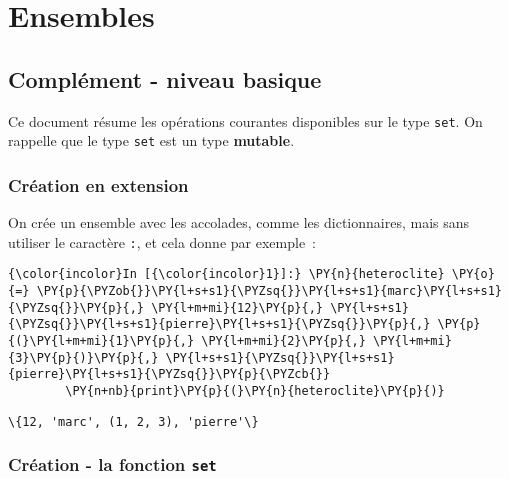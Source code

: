     
    
    
    

    

    \hypertarget{ensembles}{%
\section{Ensembles}\label{ensembles}}

    \hypertarget{compluxe9ment---niveau-basique}{%
\subsection{Complément - niveau
basique}\label{compluxe9ment---niveau-basique}}

    Ce document résume les opérations courantes disponibles sur le type
\texttt{set}. On rappelle que le type \texttt{set} est un type
\textbf{mutable}.

    \hypertarget{cruxe9ation-en-extension}{%
\subsubsection{Création en extension}\label{cruxe9ation-en-extension}}

    On crée un ensemble avec les accolades, comme les dictionnaires, mais
sans utiliser le caractère \texttt{:}, et cela donne par exemple~:

    \begin{Verbatim}[commandchars=\\\{\},frame=single,framerule=0.3mm,rulecolor=\color{cellframecolor}]
{\color{incolor}In [{\color{incolor}1}]:} \PY{n}{heteroclite} \PY{o}{=} \PY{p}{\PYZob{}}\PY{l+s+s1}{\PYZsq{}}\PY{l+s+s1}{marc}\PY{l+s+s1}{\PYZsq{}}\PY{p}{,} \PY{l+m+mi}{12}\PY{p}{,} \PY{l+s+s1}{\PYZsq{}}\PY{l+s+s1}{pierre}\PY{l+s+s1}{\PYZsq{}}\PY{p}{,} \PY{p}{(}\PY{l+m+mi}{1}\PY{p}{,} \PY{l+m+mi}{2}\PY{p}{,} \PY{l+m+mi}{3}\PY{p}{)}\PY{p}{,} \PY{l+s+s1}{\PYZsq{}}\PY{l+s+s1}{pierre}\PY{l+s+s1}{\PYZsq{}}\PY{p}{\PYZcb{}}
        \PY{n+nb}{print}\PY{p}{(}\PY{n}{heteroclite}\PY{p}{)}
\end{Verbatim}


    \begin{Verbatim}[commandchars=\\\{\},frame=single,framerule=0.3mm,rulecolor=\color{cellframecolor}]
\{12, 'marc', (1, 2, 3), 'pierre'\}
\end{Verbatim}

    \hypertarget{cruxe9ation---la-fonction-set}{%
\subsubsection{\texorpdfstring{Création - la fonction
\texttt{set}}{Création - la fonction set}}\label{cruxe9ation---la-fonction-set}}

